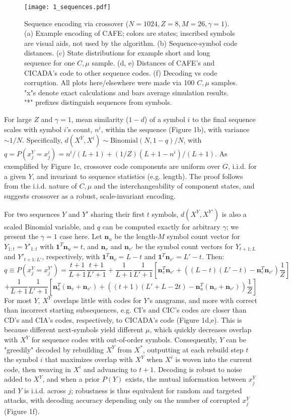 \documentclass{article}
\begin{document}
\begin{figure}
  \centering
  \texttt{[image: 1\_sequences.pdf]}
  \caption{Sequence encoding via crossover ($N=1024, Z=8, M=26, \gamma=1$). (a) Example encoding of CAFE; colors are states; inscribed symbols are visual aids, not used by the algorithm. (b) Sequence-symbol code distances. (c) State distributions for example short and long sequence for one $C, \mu$ sample. (d, e) Distances of CAFE's and CICADA's code to other sequence codes. (f) Decoding vs code corruption. All plots here/elsewhere were made via 100 $C, \mu$ samples. "x"s denote exact calculations and bars average simulation results. "*" prefixes distinguish sequences from symbols.}
  \label{fig:1}
\end{figure}

For large $Z$ and $\gamma = 1$, mean similarity ($1-d$) of a symbol $i$ to the final sequence scales with symbol $i$'s count, $n^i$, within the sequence (Figure 1b), with variance $\sim 1/N$. Specifically, $d(X^Y, X^i) \sim \textrm{Binomial}(N, 1-q)/N$, with $q = P(x^Y_j = x^i_j) = n^i/(L+1) + (1/Z)(L+1-n^i)/(L+1)$. As exemplified by Figure 1c, crossover code components are uniform over $G$, i.i.d. for a given $Y$, and invariant to sequence statistics (e.g. length). The proof follows from the i.i.d. nature of $C, \mu$ and the interchangeability of component states, and suggests crossover as a robust, scale-invariant encoding.

For two sequences $Y$ and $Y'$ sharing their first $t$ symbols, $d(X^Y, X^{Y'})$ is also a scaled Binomial variable, and $q$ can be computed exactly for arbitrary $\gamma$; we present the $\gamma = 1$ case here. Let $\mathbf{n}_u$ be the length-$M$ symbol count vector for $Y_{1:t} = Y'_{1:t}$ with $\mathbf{1}^T\mathbf{n}_u = t$, and $\mathbf{n}_v$ and $\mathbf{n}_{v'}$ be the symbol count vectors for $Y_{t+1:L}$ and $Y'_{t+1:L'}$, respectively, with $\mathbf{1}^T\mathbf{n}_{v} = L - t$ and $\mathbf{1}^T\mathbf{n}_{v'} = L' - t$. Then:
$$q \equiv P(x_j^Y = x_j^{Y'}) = \frac{t+1}{L+1}\frac{t+1}{L'+1} + \frac{1}{L+1}\frac{1}{L'+1}\left[\mathbf{n}^T_v\mathbf{n}_{v'} + \left((L-t)(L'-t) - \mathbf{n}^T_v\mathbf{n}_{v'} \right)\frac{1}{Z}\right]$$
$$+\frac{1}{L+1}\frac{1}{L'+1}\left[
\mathbf{n}^T_{u}(\mathbf{n}_{v} + \mathbf{n}_{v'}) + \left((t+1)(L'+L-2t) - \mathbf{n}^T_{u}(\mathbf{n}_{v} + \mathbf{n}_{v'})
 \right)\frac{1}{Z}
\right]$$
For most $Y$, $X^Y$ overlaps little with codes for $Y$'s anagrams, and more with correct than incorrect starting subsequences, e.g. CI's and CIC's codes are closer than CD's and CIA's codes, respectively, to CICADA's code (Figure 1d,e). This is because different next-symbols yield different $\mu$, which quickly decreases overlap with $X^Y$ for sequence codes with out-of-order symbols. Consequently, $Y$ can be "greedily" decoded by rebuilding $X^Y$ from $X^*$, outputting at each rebuild step $t$ the symbol $i$ that maximizes overlap with $X^Y$ when $X^i$ is woven into the current code, then weaving in $X^i$ and advancing to $t+1$. Decoding is robust to noise added to $X^Y$, and when a prior $P(Y)$ exists, the mutual information between $x_j^Y$ and $Y$ is i.i.d. across $j$; robustness is thus equivalent for random and targeted attacks, with decoding accuracy depending only on the number of corrupted $x_j^Y$ (Figure 1f).
\end{document}
